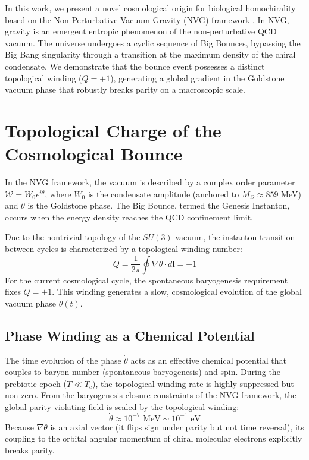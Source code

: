 \documentclass[12pt,a4paper]{article}
\begin{document}
In this work, we present a novel cosmological origin for biological homochirality based on the Non-Perturbative Vacuum Gravity (NVG) framework \cite{nvg2024}. In NVG, gravity is an emergent entropic phenomenon of the non-perturbative QCD vacuum. The universe undergoes a cyclic sequence of Big Bounces, bypassing the Big Bang singularity through a transition at the maximum density of the chiral condensate. We demonstrate that the bounce event possesses a distinct topological winding ($Q = +1$), generating a global gradient in the Goldstone vacuum phase that robustly breaks parity on a macroscopic scale.

\section{Topological Charge of the Cosmological Bounce}

In the NVG framework, the vacuum is described by a complex order parameter $\mathcal{W} = W_0 e^{i\theta}$, where $W_0$ is the condensate amplitude (anchored to $M_\Omega \approx 859$ MeV) and $\theta$ is the Goldstone phase. The Big Bounce, termed the Genesis Instanton, occurs when the energy density reaches the QCD confinement limit.

Due to the nontrivial topology of the $SU(3)$ vacuum, the instanton transition between cycles is characterized by a topological winding number:
\begin{equation}
    Q = \frac{1}{2\pi} \oint \nabla \theta \cdot d\mathbf{l} = \pm 1
\end{equation}
For the current cosmological cycle, the spontaneous baryogenesis requirement fixes $Q = +1$. This winding generates a slow, cosmological evolution of the global vacuum phase $\theta(t)$.

\subsection{Phase Winding as a Chemical Potential}

The time evolution of the phase $\dot{\theta}$ acts as an effective chemical potential that couples to baryon number (spontaneous baryogenesis) and spin. During the prebiotic epoch ($T \ll T_c$), the topological winding rate is highly suppressed but non-zero. From the baryogenesis closure constraints of the NVG framework, the global parity-violating field is scaled by the topological winding:
\begin{equation}
    \dot{\theta} \approx 10^{-7} \text{ MeV} \sim 10^{-1} \text{ eV}
\end{equation}
Because $\nabla\theta$ is an axial vector (it flips sign under parity but not time reversal), its coupling to the orbital angular momentum of chiral molecular electrons explicitly breaks parity.
\end{document}
